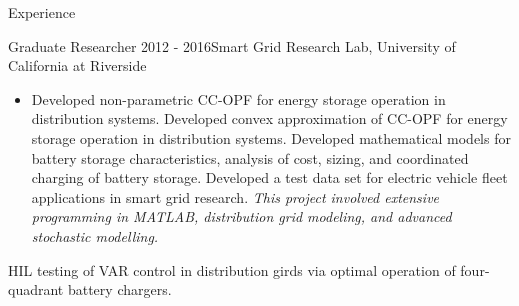 \documentclass{resume} %
\begin{document}
\begin{rSection}{ Experience}
\begin{rSubsection}{Graduate Researcher}{ 2012 - 2016}{Smart Grid Research Lab, University of California at Riverside}{}
\begin{itemize}
\item [] Developed non-parametric CC-OPF  for energy storage operation in distribution systems.
Developed   convex approximation of CC-OPF for energy storage operation in distribution systems.
Developed mathematical models for battery storage characteristics,  analysis of   cost, sizing, and coordinated charging of battery storage.
%
%
Developed a test data set for electric vehicle fleet applications in smart grid research. 
\emph{This project involved extensive programming in  MATLAB, distribution grid modeling, and advanced stochastic modelling.}

\end{itemize}








\item[] HIL testing of VAR control in distribution girds via optimal operation of four-quadrant battery chargers.


\end{rSubsection}
\end{rSection}
\end{document}
